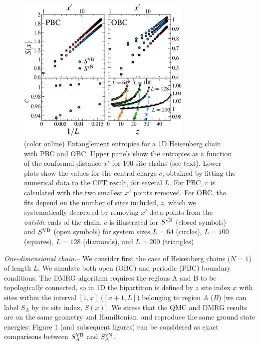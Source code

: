 \documentclass[prl,aps,twocolumn,floatfix,amsmath,amssymb,superscriptaddress,tightenlines]{revtex4}
\begin{document}
\begin{figure} {
\includegraphics[width=3.3in]{4-panelFIG1.eps} \caption{(color online) 
Entanglement entropies for a 1D Heisenberg chain with PBC and OBC. Upper panels show the entropies as a
function of the conformal distance $x'$ for 100-site chains (see text).
Lower plots show the values for the central charge $c$, obtained by
fitting the numerical data to the CFT result, for several $L$.
For PBC, $c$ is calculated with the two smallest $x'$ points removed.
For OBC, the fits depend on the number of sites included, $z$,
which we
systematically decreased by
removing $x'$ data points from the {\it outside} ends of the chain.
$c$ is illustrated for $S^{\rm vN}$ (closed symbols) and $S^{\rm VB}$ (open
symbols) for system sizes $L=64$ (circles), $L=100$ (squares), $L=128$
(diamonds), and $L=200$ (triangles) \label{1D}}} \end{figure}

{\it One-dimensional chain.}-- We consider first the case of Heisenberg
chains ($N=1$) of length $L$. We simulate both open (OBC) and periodic (PBC) boundary conditions.
The DMRG algorithm requires the regions A and B to
be topologically connected, so in 1D the bipartition is defined by a site
index $x$ with sites within the interval $[1,x]$ ($[x+1,L]$) belonging to
region $A$ ($B$) [we can label $S_A$ by its site index, $S(x)$].
We stress that the QMC and DMRG results are on the same geometry and
Hamiltonian, and reproduce the same ground state energies; Figure 1 (and subsequent figures) can be considered as exact comparisons between $S^{\rm VB}_A$ and $S^{ \rm vN}_A$.
\end{document}
